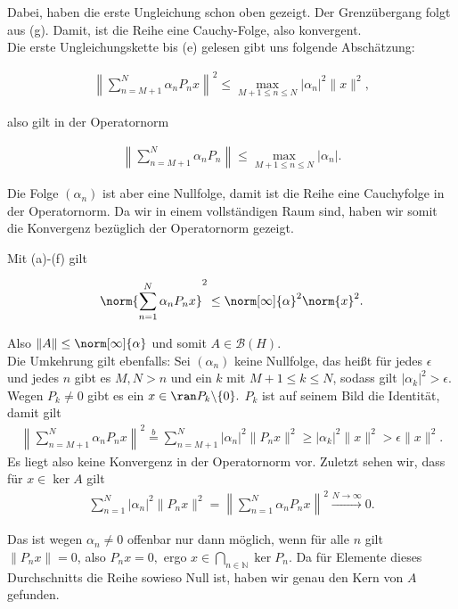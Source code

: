 \begin{solution}
Dabei, haben die erste Ungleichung schon oben gezeigt.
Der Grenzübergang folgt aus (g).
Damit, ist die Reihe eine Cauchy-Folge, also konvergent. \\

Die erste Ungleichungskette bis (e) gelesen gibt uns folgende Abschätzung:

\begin{align*}
\left\| \sum_{n = M+1}^N \alpha_n P_n x \right\|^2 \leq \max_{M+1 \leq n \leq N} |\alpha_n|^2 \|x\|^2,
\end{align*}

also gilt in der Operatornorm

\begin{align*}
\left\| \sum_{n = M+1}^N \alpha_n P_n \right\| \leq \max_{M+1 \leq n \leq N} |\alpha_n|.
\end{align*}

Die Folge $(\alpha_n)$ ist aber eine Nullfolge, damit ist die Reihe eine Cauchyfolge in der Operatornorm. Da wir in einem vollständigen Raum sind, haben wir somit die Konvergenz bezüglich der Operatornorm gezeigt.

Mit (a)-(f) gilt

\begin{align*}
    \norm{\sum_{n = 1}^N \alpha_n P_n x}^2
    \leq
    \norm[\infty]{\alpha}^2 \norm{x}^2.
\end{align*}

Also $\|A\| \leq \norm[\infty]{\alpha}$ und somit $A \in \mathcal{B}(H)$. \\

Die Umkehrung gilt ebenfalls: Sei $(\alpha_n)$ keine Nullfolge, das heißt für jedes $\epsilon$ und jedes $n$ gibt es $M, N > n$ und ein $k$ mit $M+1 \leq k \leq N$, sodass gilt $|\alpha_k|^2 > \epsilon.$ Wegen $P_k \neq 0$ gibt es ein $x \in \ran P_k\backslash\{0\}.$ $P_k$ ist auf seinem Bild die Identität, damit gilt
\begin{align}
 \left\| \sum_{n = M+1}^N \alpha_n P_n x \right\|^2 \stackrel{b}{=} \sum_{n = M+1}^N | \alpha_n|^2 \| P_n x \|^2 \geq |\alpha_k|^2 \|x\|^2 > \epsilon \|x\|^2.
\end{align}
Es liegt also keine Konvergenz in der Operatornorm vor.
Zuletzt sehen wir, dass für $x \in \ker A$ gilt
\begin{align*}
    \sum_{n=1}^N |\alpha_n|^2 \|P_n x\|^2 =
    \left\| \sum_{n = 1}^N \alpha_n P_n x \right\|^2 \stackrel{N \rightarrow \infty}{\longrightarrow} 0.
\end{align*}

Das ist wegen $\alpha_n \neq 0$ offenbar nur dann möglich, wenn für alle $n$ gilt $\|P_n x\| = 0$, also $P_n x = 0,$ ergo $x \in \bigcap_{n \in \mathbb{N}} \ker P_n$. Da für Elemente dieses Durchschnitts die Reihe sowieso Null ist, haben wir genau den Kern von $A$ gefunden.

\end{solution}
